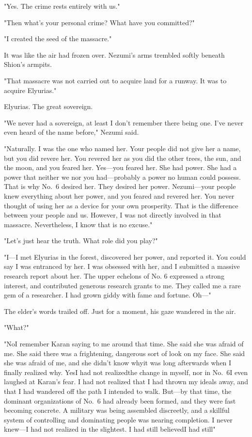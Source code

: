 "Yes. The crime rests entirely with us."

"Then what's your personal crime? What have you committed?"

"I created the seed of the massacre."

It was like the air had frozen over. Nezumi's arms trembled softly
beneath Shion's armpits.

"That massacre was not carried out to acquire land for a runway. It was
to acquire Elyurias."

Elyurias. The great sovereign.

\mybreak

"We never had a sovereign, at least I don't remember there being one.
I've never even heard of the name before," Nezumi said.

"Naturally. I was the one who named her. Your people did not give her a
name, but you did revere her. You revered her as you did the other
trees, the sun, and the moon, and you feared her. Yes---you feared her.
She had power. She had a power that neither we nor you had---probably a
power no human could possess. That is why No.~6 desired her. They
desired her power. Nezumi---your people knew everything about her power,
and you feared and revered her. You never thought of using her as a
device for your own prosperity. That is the difference between your
people and us. However, I was not directly involved in that massacre.
Nevertheless, I know that is no excuse."

"Let's just hear the truth. What role did you play?"

"I---I met Elyurias in the forest, discovered her power, and reported it.
You could say I was entranced by her. I was obsessed with her, and I
submitted a massive research report about her. The upper echelons of No.
6 expressed a strong interest, and contributed generous research grants
to me. They called me a rare gem of a researcher. I had grown giddy with
fame and fortune. Oh---"

The elder's words trailed off. Just for a moment, his gaze wandered in
the air.

"What?"

"No\el I remember Karan saying to me around that time. She said she was
afraid of me. She said there was a frightening, dangerous sort of look
on my face. She said she was afraid of me, and she didn't know why\el it
was long afterwards when I finally realized why. Yes\el I had not
realized\el the change in myself, nor in No.~6\el I even laughed at
Karan's fear. I had not realized that I had thrown my ideals away, and
that I had wandered off the path I intended to walk. But---by that time,
the dominant organizations of No.~6 had already been formed, and they
were fast becoming concrete. A military was being assembled discreetly,
and a skillful system of controlling and dominating people was nearing
completion. I never knew---I had not realized in the slightest. I had
still believed\el I had still\el "

